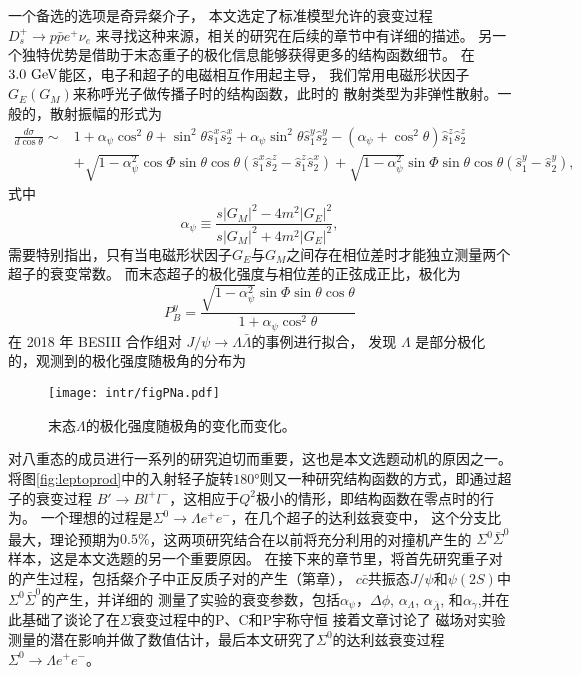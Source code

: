 一个备选的选项是奇异粲介子，
本文选定了标准模型允许的衰变过程$D_{s}^{+} \to p \bar{p} e^{+} \nu_{e}$
来寻找这种来源，相关的研究在后续的章节中有详细的描述。
另一个独特优势是借助于末态重子的极化信息能够获得更多的结构函数细节。
在$3.0~{\rm GeV}$能区，电子和超子的电磁相互作用起主导，
我们常用电磁形状因子$G_{E}(G_{M})$来称呼光子做传播子时的结构函数，此时的
散射类型为非弹性散射。一般的，散射振幅的形式为
\begin{equation}
    \begin{split}
        \frac{d\sigma}{d \cos\theta}  \sim & 1+ \alpha _{\psi } \cos^2\theta
        + \sin ^2\theta \hat{s}_{1}^x \hat{s}_{2}^x
        + \alpha_{\psi} \sin^2\theta \hat{s}_{1}^y \hat{s}_{2}^y 
        - \left( \alpha_{\psi} +\cos^2 \theta  \right)\hat{s}_{1}^z
        \hat{s}_{2}^z \\
        &+ \sqrt{1-\alpha_{\psi}^2} \cos\Phi  \sin\theta 
          \cos\theta
        \left( \hat{s}_{1}^x \hat{s}_{2}^z  - \hat{s}_{1}^z \hat{s}_{2}^x\right)
        +\sqrt{1-\alpha _{\psi}^2}
        \sin\Phi  \sin\theta \cos\theta  (\hat{s}_{1}^y - \hat{s}_{2}^y),
    \end{split}
    \label{eq:BBbar_amplitude}
\end{equation}
式中
\begin{equation}
    \alpha_{\psi} \equiv \frac{s |G_{M}|^{2} -4 m^{2} |G_{E}|^{2} }
    {s|G_{M}|^{2} + 4 m^{2}|G_{E}|^{2}},
\end{equation}
需要特别指出，只有当电磁形状因子$G_{E}$与$G_{M}$之间存在相位差时才能独立测量两个超子的衰变常数。
而末态超子的极化强度与相位差的正弦成正比，极化为
\begin{equation}
    P^{y}_{B} = \frac{\sqrt{1 - \alpha_{\psi}^{2}} \sin \Phi
    \sin \theta \cos \theta}
    {1+ \alpha_{\psi} \cos^{2} \theta}
\end{equation}
在 2018 年 BESIII 合作组\cite{Ablikim:2018zay}对 $J/\psi \to \Lambda \bar{\Lambda}$的事例进行拟合，
发现 $\Lambda$ 是部分极化的，观测到的极化强度随极角的分布为
\begin{figure}[htpb]
    \centering
    \texttt{[image: intr/figPNa.pdf]}
    \caption{末态$\Lambda$的极化强度随极角的变化而变化。}%
    \label{fig:figPNa}
\end{figure}
对八重态的成员进行一系列的研究迫切而重要，这也是本文选题动机的原因之一。
将图\ref{fig:leptoprod}中的入射轻子旋转$180$°则又一种研究结构函数的方式，即通过超子的衰变过程
$B' \to B l^{+} l^{-}$，这相应于$Q^{2}$极小的情形，即结构函数在零点时的行为。
一个理想的过程是$\Sigma^{0} \to \Lambda e^{+} e^{-}$，在几个超子的达利兹衰变中，
这个分支比最大，理论预期为$0.5\%$，这两项研究结合在以前将充分利用的对撞机产生的
$\Sigma^{0} \bar{\Sigma}^{0}$样本，这是本文选题的另一个重要原因。 
在接下来的章节里，将首先研究重子对的产生过程，包括粲介子中正反质子对的产生（第章），
$c\bar{c}$共振态$J/\psi$和$\psi(2S)$中$\Sigma^{0}\bar{\Sigma}^{0}$的产生，并详细的
测量了实验的衰变参数，包括$\alpha_{\psi}$，$\Delta \phi$, $\alpha_{\Lambda}$, $\alpha_{\bar{\Lambda}}$,
和$\alpha_{\gamma}$,并在此基础了谈论了在$\Sigma$衰变过程中的P、C和P宇称守恒
接着文章讨论了
磁场对实验测量的潜在影响并做了数值估计，最后本文研究了$\Sigma^{0}$的达利兹衰变过程
$\Sigma^{0} \to \Lambda e^{+} e^{-}$。


